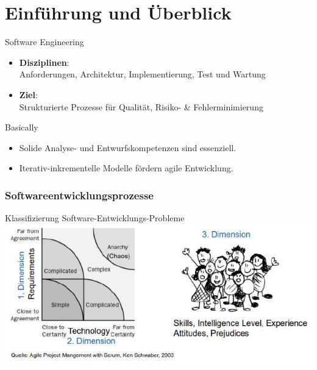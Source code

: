 \section{Einführung und Überblick}

\begin{definition}{Software Engineering}
\begin{itemize}
    \item \textbf{Disziplinen}: \\
    Anforderungen, Architektur, Implementierung, Test und Wartung
    \item \textbf{Ziel}: \\
    Strukturierte Prozesse für Qualität, Risiko- \& Fehlerminimierung
\end{itemize}
\end{definition}

\begin{concept}{Basically}
\begin{itemize}
    \item Solide Analyse- und Entwurfskompetenzen sind essenziell.
    \item Iterativ-inkrementelle Modelle fördern agile Entwicklung.
\end{itemize}
\end{concept}

\subsubsection{Softwareentwicklungsprozesse}

\begin{theorem}{Klassifizierung Software-Entwicklungs-Probleme}\\
  \includegraphics[width=\linewidth]{images/2024_12_29_0d1d7b5551ea1b4b41bdg-01}
\end{theorem}


